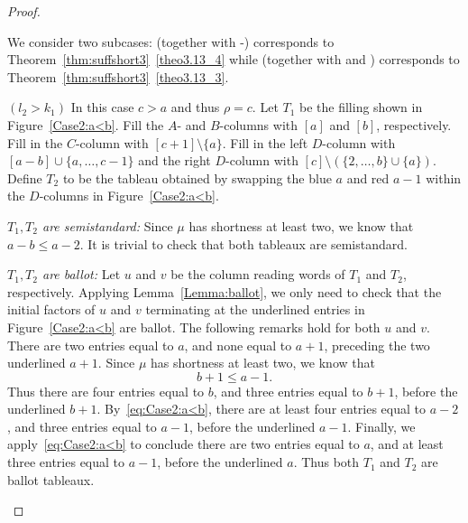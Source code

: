 \begin{proof}
\begin{Case}
\begin{figure}[htb]
\begin{tikzpicture}
 
 \end{tikzpicture}
 \caption[Case 2]{}
 \label{Case2}
\end{figure}

We consider two subcases:  (together with -) corresponds to Theorem~\ref{thm:suffshort3}~\ref{theo3.13_4} while  (together with  and ) corresponds to Theorem~\ref{thm:suffshort3}~\ref{theo3.13_3}.


\end{Case}

\begin{Case}
{ $(l_2 > k_1)$} 
In this case $c>a$ and thus $\rho = c$. Let $T_1$ be the filling shown in Figure~\ref{Case2:a<b}. Fill the $A$- and $B$-columns with $[a]$ and $[b]$, respectively. Fill in the $C$-column with $[c+1]\setminus \{a\}$. Fill in the left $D$-column with $[a-b]\cup \{a,\ldots,c-1\}$ and the right $D$-column with $[c]\setminus (\{2,\ldots,b\}\cup\{a\})$. Define $T_2$ to be the tableau obtained by swapping the blue $a$ and red $a-1$ within the $D$-columns in Figure~\ref{Case2:a<b}.

\emph{$T_1,T_2$ are semistandard:} Since $\mu$ has shortness at least two, we know that $a-b \leq a-2$. It is trivial to check that both tableaux are semistandard.

\emph{$T_1,T_2$ are ballot:} Let $u$ and $v$ be the column reading words of $T_1$ and $T_2$, respectively. Applying Lemma~\ref{Lemma:ballot}, we only need to check that the initial factors of $u$ and $v$ terminating at the underlined entries in Figure~\ref{Case2:a<b} are ballot. The following remarks hold for both $u$ and $v$. There are two entries equal to $a$, and none equal to $a+1$, preceding the two underlined $a+1$. Since $\mu$ has shortness at least two, we know that 
\begin{equation}
\label{eq:Case2:a<b}
b+1 \leq a-1.
\end{equation}
Thus there are four entries equal to $b$, and three entries equal to $b+1$, before the underlined $b+1$. By~\eqref{eq:Case2:a<b}, there are at least four entries equal to $a-2$, and three entries equal to $a-1$, before the underlined $a-1$. Finally, we apply~\eqref{eq:Case2:a<b} to conclude there are two entries equal to $a$, and at least three entries equal to $a-1$, before the underlined $a$. Thus both $T_1$ and $T_2$ are ballot tableaux.


\end{Case}
\end{proof}

